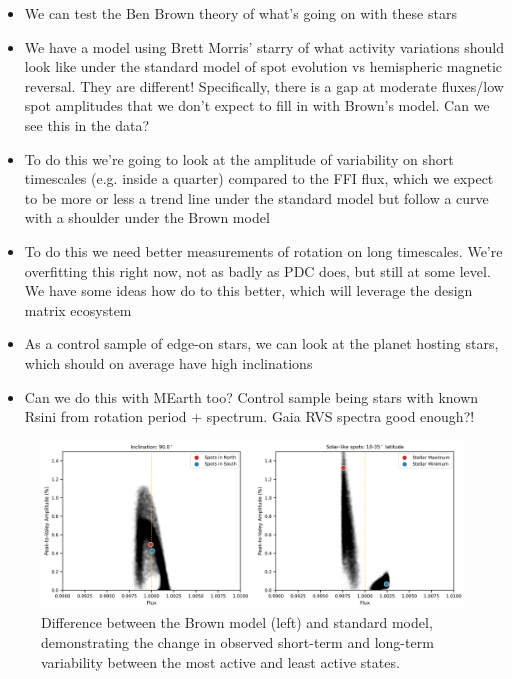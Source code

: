 \documentclass[twocolumn,dvipsnames]{aastex631}
\begin{document}
\begin{itemize}

\item{We can test the Ben Brown theory of what's going on with these stars}
\item{We have a model using Brett Morris' starry of what activity variations should look like under the
standard model of spot evolution vs hemispheric magnetic reversal. They are different!
Specifically, there is a gap at moderate fluxes/low spot amplitudes that we don't expect to fill in with Brown's model. Can we see this in the data?}
\item{To do this we're going to look at the amplitude of variability on short timescales (e.g. inside a quarter) compared to the FFI flux, which we expect to be more or less a trend line under the standard model but follow a curve with a shoulder under the Brown model}
\item{To do this we need better measurements of rotation on long timescales. We're overfitting this right now, not as badly as PDC does, but still at some level. We have some ideas how do to this better, which will leverage the design matrix ecosystem}
\item{As a control sample of edge-on stars, we can look at the planet hosting stars, which should on average have high inclinations}
\item{Can we do this with MEarth too? Control sample being stars with known Rsini from rotation period + spectrum. Gaia RVS spectra good enough?!}

\end{itemize}

\begin{figure}
    \centering
    \includegraphics[width=1.0\textwidth]{figures/fleck_solar_like.png}
    \caption{Difference between the Brown model (left) and standard model, demonstrating the change in observed short-term and long-term variability between the most active and least active states.}
    \label{fig:fleck}
\end{figure}


{}

\end{document}
